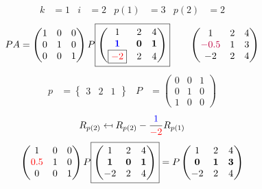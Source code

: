 \documentclass[pdf]{beamer}
\begin{document}
\begin{frame}{}\begin{align*} k &= 1 & i &= 2 & p(1) &= 3 & p(2) &= 2\end{align*} $$PA=\begin{pmatrix}1&0&0\\0&1&0\\0&0&1\end{pmatrix} P \boxed{\begin{pmatrix}1&2&4\\\mathbf{{\color{blue}1}}&\mathbf{0}&\mathbf{1}\\\boxed{{\color{red}-2}}&2&4\end{pmatrix}} \quad\quad \begin{pmatrix}1&2&4\\{\color{purple}-0.5}&1&3\\-2&2&4\end{pmatrix}$$ \begin{align*} p&= \begin{Bmatrix}3&2&1\end{Bmatrix} & P&= \begin{pmatrix}0&0&1\\0&1&0\\1&0&0\end{pmatrix} \end{align*} $$R_{p(2)} \mapsfrom R_{p(2)} - \frac{{\color{blue}1}}{{\color{red}-2}} R_{p(1)}$$ $$ \begin{pmatrix}1&0&0\\{\color{red}0.5}&1&0\\0&0&1\end{pmatrix} P \boxed{\begin{pmatrix}1&2&4\\\mathbf{1}&\mathbf{0}&\mathbf{1}\\-2&2&4\end{pmatrix}} = P \begin{pmatrix}1&2&4\\\mathbf{0}&\mathbf{1}&\mathbf{3}\\-2&2&4\end{pmatrix} $$\end{frame}
\end{document}
